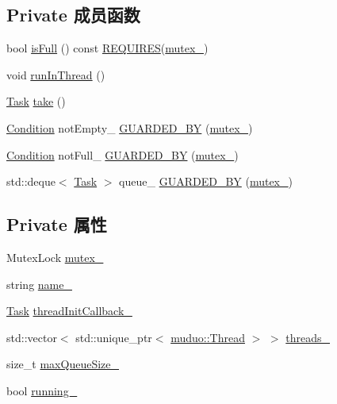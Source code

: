 \subsection*{Private 成员函数}
\begin{DoxyCompactItemize}
\item 
bool \hyperlink{classmuduo_1_1ThreadPool_a0b7ed836c5f394b7dde28e7ca17eb40c}{is\+Full} () const \hyperlink{Mutex_8h_a96848b74000220f6531e6f7ba197a296}{R\+E\+Q\+U\+I\+R\+ES}(\hyperlink{classmuduo_1_1ThreadPool_a6e1bf1809a42f40f1a21178dc6620a6f}{mutex\+\_\+})
\item 
void \hyperlink{classmuduo_1_1ThreadPool_aa749f15d9283ccb246c7d458e2eea2d5}{run\+In\+Thread} ()
\item 
\hyperlink{classmuduo_1_1ThreadPool_a46c264006febdf6c5dae5921d59c18d2}{Task} \hyperlink{classmuduo_1_1ThreadPool_a3a83b91742d92c2ed7cc4c56b61912f0}{take} ()
\item 
\hyperlink{classmuduo_1_1Condition}{Condition} not\+Empty\+\_\+ \hyperlink{classmuduo_1_1ThreadPool_adc809585805fc6f065fa7414c29ab2af}{G\+U\+A\+R\+D\+E\+D\+\_\+\+BY} (\hyperlink{classmuduo_1_1ThreadPool_a6e1bf1809a42f40f1a21178dc6620a6f}{mutex\+\_\+})
\item 
\hyperlink{classmuduo_1_1Condition}{Condition} not\+Full\+\_\+ \hyperlink{classmuduo_1_1ThreadPool_aa1da415b15700639c638f90b2cd4850a}{G\+U\+A\+R\+D\+E\+D\+\_\+\+BY} (\hyperlink{classmuduo_1_1ThreadPool_a6e1bf1809a42f40f1a21178dc6620a6f}{mutex\+\_\+})
\item 
std\+::deque$<$ \hyperlink{classmuduo_1_1ThreadPool_a46c264006febdf6c5dae5921d59c18d2}{Task} $>$ queue\+\_\+ \hyperlink{classmuduo_1_1ThreadPool_aa65d6f2d969cc95a8a393bdd2da7b67e}{G\+U\+A\+R\+D\+E\+D\+\_\+\+BY} (\hyperlink{classmuduo_1_1ThreadPool_a6e1bf1809a42f40f1a21178dc6620a6f}{mutex\+\_\+})
\end{DoxyCompactItemize}
\subsection*{Private 属性}
\begin{DoxyCompactItemize}
\item 
Mutex\+Lock \hyperlink{classmuduo_1_1ThreadPool_a6e1bf1809a42f40f1a21178dc6620a6f}{mutex\+\_\+}
\item 
string \hyperlink{classmuduo_1_1ThreadPool_a79cfd788b219a7f48068d0e96e5e8e77}{name\+\_\+}
\item 
\hyperlink{classmuduo_1_1ThreadPool_a46c264006febdf6c5dae5921d59c18d2}{Task} \hyperlink{classmuduo_1_1ThreadPool_ad985abd32dc4aa2c30852570d3a57136}{thread\+Init\+Callback\+\_\+}
\item 
std\+::vector$<$ std\+::unique\+\_\+ptr$<$ \hyperlink{classmuduo_1_1Thread}{muduo\+::\+Thread} $>$ $>$ \hyperlink{classmuduo_1_1ThreadPool_ae497beb888525fad65f6fd9e8f2bc429}{threads\+\_\+}
\item 
size\+\_\+t \hyperlink{classmuduo_1_1ThreadPool_abb3d9b1dbeac8214e3506703261d8280}{max\+Queue\+Size\+\_\+}
\item 
bool \hyperlink{classmuduo_1_1ThreadPool_aa440b02cc99bc6923375b0c9db2f2dca}{running\+\_\+}
\end{DoxyCompactItemize}



